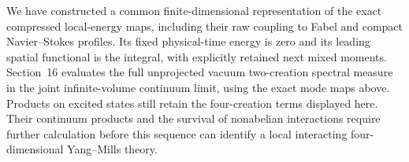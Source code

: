 We have constructed a common finite-dimensional representation of
the exact compressed local-energy maps, including their raw coupling
to Fabel and compact Navier--Stokes profiles. Its fixed physical-time
energy is zero and its leading spatial functional is the integral,
with explicitly retained next mixed moments. Section~16 evaluates
the full unprojected vacuum two-creation spectral measure in the
joint infinite-volume continuum limit, using the exact mode maps
above. Products on excited states still retain the four-creation
terms displayed here. Their continuum products and the survival of
nonabelian interactions require further calculation before this
sequence can identify a local interacting four-dimensional
Yang--Mills theory.

